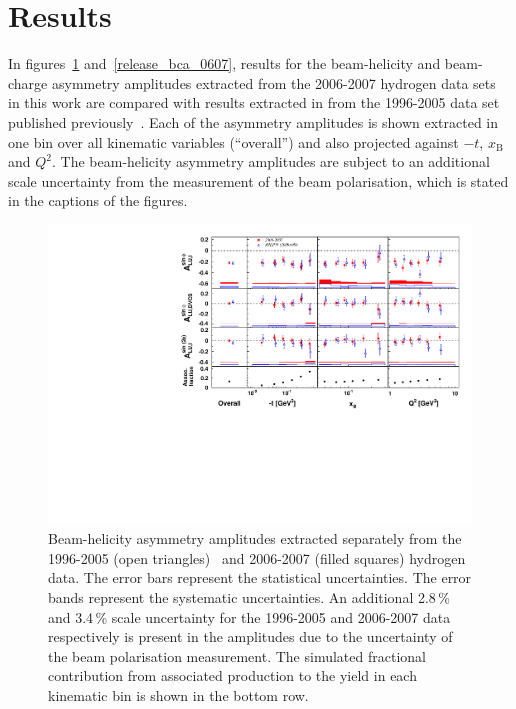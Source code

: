\section{Results}
In figures~\ref{release_bsa_0607} and~\ref{release_bca_0607}, results for the beam-helicity and beam-charge asymmetry amplitudes extracted from the 2006-2007 hydrogen data sets in this work are compared with results extracted in  from the 1996-2005 data set published previously~\cite{Air09}. Each of the asymmetry amplitudes is shown extracted in one bin over all kinematic variables (``overall'') and also projected against $-t$, $x_{\textrm{B}}$ and $Q^{2}$. The beam-helicity asymmetry amplitudes are subject to an additional scale uncertainty from the measurement of the beam polarisation, which is stated in the captions of the figures.
\begin{figure}
\begin{center}
\includegraphics[width=15cm,keepaspectratio]{bsa_sep}
  \caption{Beam-helicity asymmetry amplitudes extracted separately from
the 1996-2005 (open triangles)~\cite{Air09} and 2006-2007 (filled squares)
hydrogen data. The error bars represent the statistical uncertainties. The error bands represent the systematic uncertainties.
An additional 2.8\,\% and 3.4\,\% scale uncertainty for the 1996-2005 and
2006-2007 data respectively is present in the amplitudes due to the uncertainty of
the beam polarisation measurement. The simulated fractional contribution from associated production to the yield in each kinematic bin is shown in the bottom row.}
 \label{release_bsa_0607}
\end{center}
 \end{figure}

